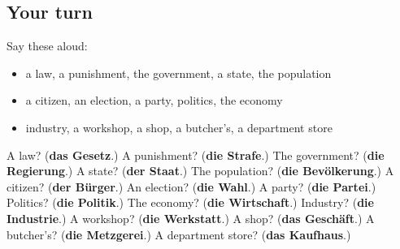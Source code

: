 \subsection*{Your turn}
Say these aloud:

\begin{itemize}
\raggedright
  \item a law, a punishment, the government, a state, the population
  \item a citizen, an election, a party, politics, the economy
  \item industry, a workshop, a shop, a butcher's, a department store
\end{itemize}

\begin{tcolorbox}[breakable,colback=teal!4,colframe=teal!35!black,title={Before you move on}]
A law? (\textbf{das Gesetz}.) A punishment? (\textbf{die Strafe}.) The government? (\textbf{die Regierung}.) A state? (\textbf{der Staat}.) The population? (\textbf{die Bevölkerung}.) A citizen? (\textbf{der Bürger}.) An election? (\textbf{die Wahl}.) A party? (\textbf{die Partei}.) Politics? (\textbf{die Politik}.) The economy? (\textbf{die Wirtschaft}.) Industry? (\textbf{die Industrie}.) A workshop? (\textbf{die Werkstatt}.) A shop? (\textbf{das Geschäft}.) A butcher's? (\textbf{die Metzgerei}.) A department store? (\textbf{das Kaufhaus}.)
\end{tcolorbox}

